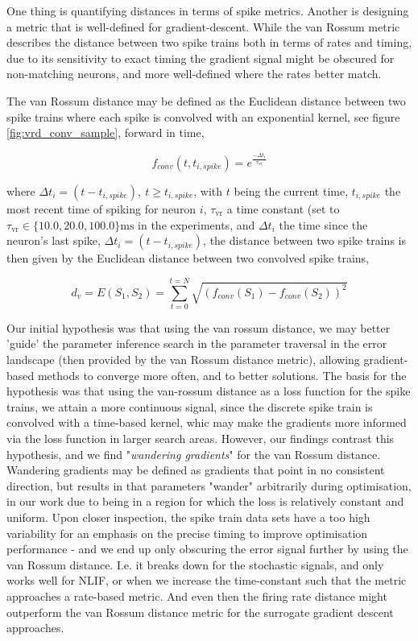 \documentclass[mphil,deptreport,ianc]{infthesis} %
\begin{document}
One thing is quantifying distances in terms of spike metrics.
Another is designing a metric that is well-defined for gradient-descent.
While the van Rossum metric describes the distance between two spike trains both in terms of rates and timing, due to its sensitivity to exact timing the gradient signal might be obscured for non-matching neurons, and more well-defined where the rates better match.

The van Rossum distance \cite{VanRossum2001} may be defined as the Euclidean distance between two spike trains where each spike is convolved with an exponential kernel, see figure \ref{fig:vrd_conv_sample}, forward in time,

\begin{equation}
    f_{conv}(t, t_{i, spike}) = e^{\frac{-\Delta t_i}{\tau_{\mathrm{vr}}}}
\end{equation}

where $\Delta t_i = (t-t_{i, spike}),\ t \geq t_{i,spike}$, 
with $t$ being the current time, $t_{i,spike}$ the most recent time of spiking for neuron $i$, $\tau_{\mathrm{vr}}$ a time constant (set to $\tau_{\mathrm{vr}} \in \{10.0, 20.0, 100.0\} \si{\ms}$ in the experiments, and $\Delta t_i$ the time since the neuron's last spike, $\Delta t_i = (t-t_{i, spike})$, the distance between two spike trains is then given by the Euclidean distance between two convolved spike trains,


\begin{equation}
    d_v = E(S_1, S_2) = \sum_{t=0}^{t=N} \sqrt{(f_{conv}(S_1)-f_{conv}(S_2))^2}
\end{equation}


Our initial hypothesis was that using the van rossum distance, we may better 'guide' the parameter inference search in the parameter traversal in the error landscape (then provided by the van Rossum distance metric), allowing gradient-based methods to converge more often, and to better solutions.
The basis for the hypothesis was that using the van-rossum distance as a loss function for the spike trains, we attain a more continuous signal, since the discrete spike train is convolved with a time-based kernel, whic may make the gradients more informed via the loss function in larger search areas.
However, our findings contrast this hypothesis, and we find "\textit{wandering gradients}" for the van Rossum distance.
Wandering gradients may be defined as gradients that point in no consistent direction, but results in that parameters "wander" arbitrarily during optimisation, in our work due to being in a region for which the loss is relatively constant and uniform.
Upon closer inspection, the spike train data sets have a too high variability for an emphasis on the precise timing to improve optimisation performance - and we end up only obscuring the error signal further by using the van Rossum distance. 
I.e. it breaks down for the stochastic signals, and only works well for NLIF, or when we increase the time-constant such that the metric approaches a rate-based metric. And even then the firing rate distance might outperform the van Rossum distance metric for the surrogate gradient descent approaches.
\end{document}
